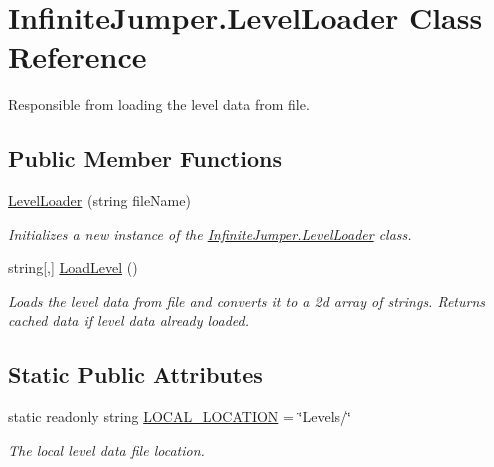 \hypertarget{class_infinite_jumper_1_1_level_loader}{}\section{Infinite\+Jumper.\+Level\+Loader Class Reference}
\label{class_infinite_jumper_1_1_level_loader}


Responsible from loading the level data from file.  


\subsection*{Public Member Functions}
\begin{DoxyCompactItemize}
\item 
\hyperlink{class_infinite_jumper_1_1_level_loader_ae1aa86d3ce06f1f5d63afb1b68660aac}{Level\+Loader} (string file\+Name)
\begin{DoxyCompactList}\small\item\em Initializes a new instance of the \hyperlink{class_infinite_jumper_1_1_level_loader}{Infinite\+Jumper.\+Level\+Loader} class. \end{DoxyCompactList}\item 
string\mbox{[},\mbox{]} \hyperlink{class_infinite_jumper_1_1_level_loader_ac9dfd09bc772400c3a190652accbb86c}{Load\+Level} ()
\begin{DoxyCompactList}\small\item\em Loads the level data from file and converts it to a 2d array of strings. Returns cached data if level data already loaded. \end{DoxyCompactList}\end{DoxyCompactItemize}
\subsection*{Static Public Attributes}
\begin{DoxyCompactItemize}
\item 
static readonly string \hyperlink{class_infinite_jumper_1_1_level_loader_ada02fbd93271e3cdaf750802fe62abff}{L\+O\+C\+A\+L\+\_\+\+L\+O\+C\+A\+T\+I\+O\+N} = \char`\"{}Levels/\char`\"{}
\begin{DoxyCompactList}\small\item\em The local level data file location. \end{DoxyCompactList}\end{DoxyCompactItemize}



